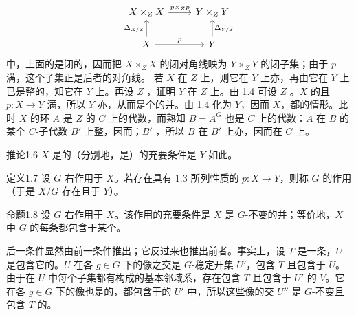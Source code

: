 \[\begin{tikzcd}X\times_ZX\arrow[r,"p\times_Zp"]&Y\times_ZY\\X\arrow[u,"\Delta_{X/Z}"]\arrow[r,"p"]&Y\arrow[u,"\Delta_{Y/Z}"']\end{tikzcd}\]
中，上面的是闭的，因而把 $X\times_ZX$ 的闭对角线映为 $Y\times_ZY$ 的闭子集；由于 $p$ 满，这个子集正是后者的对角线。
若 $X$ 在 $Z$ 上，则它在 $Y$ 上亦，再由它在 $Y$ 上已是整的，知它在 $Y$ 上。再设 $Z$ ，证明 $Y$ 在 $Z$ 上。由 1.4 可设 $Z$ 。$X$ 的且 $p:X\to Y$ 满，所以 $Y$ 亦，从而是个的并。由 1.4 化为 $Y$，因而 $X$，都的情形。此时 $X$ 的环 $A$ 是 $Z$ 的 $C$ 上的代数，而熟知 $B=A^G$ 也是 $C$ 上的代数：$A$ 在 $B$ 的某个 $C$-子代数 $B'$ 上整，因而；$B'$ ，所以 $B$ 在 $B'$ 上亦，因而在 $C$ 上。
\begin{SGAresult}{推论}{1.6}
$X$ 是的（分别地，是）的充要条件是 $Y$ 如此。
\end{SGAresult}
\begin{SGAresult}{定义}{1.7}
设 $G$ 右作用于 $X$。若存在具有 1.3 所列性质的 $p:X\to Y$，则称 $G$ 的作用（于是 $X/G$ 存在且于 $Y$）。
\end{SGAresult}
\begin{SGAresult}{命题}{1.8}
设 $G$ 右作用于 $X$。该作用的充要条件是 $X$ 是 $G$-不变的并；等价地，$X$ 中 $G$ 的每条都包含于某个。
\end{SGAresult}
后一条件显然由前一条件推出；它反过来也推出前者。事实上，设 $T$ 是一条，$U$ 是包含它的。$U$ 在各 $g\in G$ 下的像之交是 $G$-稳定开集 $U'$，包含 $T$ 且包含于 $U$。由于在 $U$ 中每个子集都有构成的基本邻域系，存在包含 $T$ 且包含于 $U'$ 的 $V$。它在各 $g\in G$ 下的像也是的，都包含于的 $U'$ 中，所以这些像的交 $U''$ 是 $G$-不变且包含 $T$ 的。
